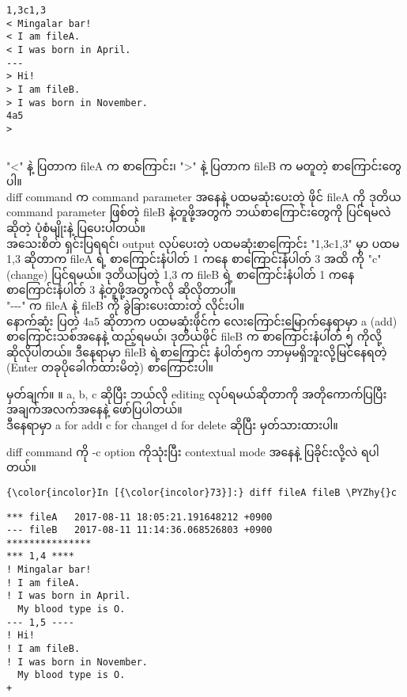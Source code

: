 \documentclass[11pt]{article}
\def\PYZhy{\char`\-}
\begin{document}
    \begin{Verbatim}[commandchars=\\\{\}]
1,3c1,3
< Mingalar bar!
< I am fileA.
< I was born in April.
---
> Hi!
> I am fileB.
> I was born in November.
4a5
> 

    \end{Verbatim}

    \begin{Verbatim}[commandchars=\\\{\}]

    \end{Verbatim}

    "\textless{}" နဲ့ ပြတာက fileA က စာကြောင်း၊ "\textgreater{}" နဲ့ ပြတာက
fileB က မတူတဲ့ စာကြောင်းတွေ ပါ။\\
diff command က command parameter အနေနဲ့ ပထမဆုံးပေးတဲ့ ဖိုင် fileA ကို
ဒုတိယ command parameter ဖြစ်တဲ့ fileB နဲ့တူဖို့အတွက် ဘယ်စာကြောင်းတွေကို
ပြင်ရမလဲ ဆိုတဲ့ ပုံစံမျိုးနဲ့ ပြပေးပါတယ်။\\
အသေးစိတ် ရှင်းပြရရင်၊ output လုပ်ပေးတဲ့ ပထမဆုံးစာကြောင်း "1,3c1,3" မှာ
ပထမ 1,3 ဆိုတာက fileA ရဲ့ စာကြောင်းနံပါတ် 1 ကနေ စာကြောင်းနံပါတ် 3 အထိ ကို
"c" (change) ပြင်ရမယ်။ ဒုတိယပြတဲ့ 1,3 က fileB ရဲ့ စာကြောင်းနံပါတ် 1 ကနေ
စာကြောင်းနံပါတ် 3 နဲ့တူဖို့အတွက်လို ဆိုလိုတာပါ။\\
"-\/-\/-" က fileA နဲ့ fileB ကို ခွဲခြားပေးထားတဲ့ လိုင်းပါ။\\
နောက်ဆုံး ပြတဲ့ 4a5 ဆိုတာက ပထမဆုံးဖိုင်က လေးကြောင်းမြောက်နေရာမှာ a (add)
စာကြောင်းသစ်အနေနဲ့ ထည့်ရမယ်၊ ဒုတိယဖိုင် fileB က စာကြောင်းနံပါတ် ၅
ကိုလို့ ဆိုလိုပါတယ်။ ဒီနေရာမှာ fileB ရဲ့စာကြောင်း နံပါတ်၅က
ဘာမှမရှိဘူးလို့မြင်နေရတဲ့ (Enter တခုပိုခေါက်ထားမိတဲ့) စာကြောင်းပါ။

မှတ်ချက်။ ။ a, b, c ဆိုပြီး ဘယ်လို editing လုပ်ရမယ်ဆိုတာကို
အတိုကောက်ပြပြီး အချက်အလက်အနေနဲ့ ဖော်ပြပါတယ်။\\
ဒီနေရာမှာ a for add၊ c for change၊ d for delete ဆိုပြီး မှတ်သားထားပါ။

diff command ကို -c option ကိုသုံးပြီး contextual mode အနေနဲ့
ပြခိုင်းလို့လဲ ရပါတယ်။

    \begin{Verbatim}[commandchars=\\\{\}]
{\color{incolor}In [{\color{incolor}73}]:} diff fileA fileB \PYZhy{}c
\end{Verbatim}

    \begin{Verbatim}[commandchars=\\\{\}]
*** fileA	2017-08-11 18:05:21.191648212 +0900
--- fileB	2017-08-11 11:14:36.068526803 +0900
***************
*** 1,4 ****
! Mingalar bar!
! I am fileA.
! I was born in April.
  My blood type is O.
--- 1,5 ----
! Hi!
! I am fileB.
! I was born in November.
  My blood type is O.
+ 

    \end{Verbatim}
\end{document}
